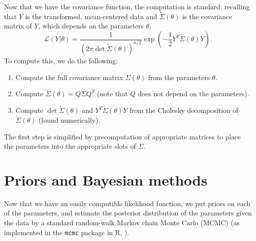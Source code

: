 \documentclass{article}
\begin{document}
Now that we have the covariance function, the computation is standard:
recalling that $Y$ is the transformed, mean-centered data and $\widetilde \Sigma(\theta)$ is the covariance matrix of $Y$,
which depends on the parameters $\theta$,
\begin{equation} \label{eqn:likelihood}
    \mathcal{L}(Y|\theta) = \frac{ 1 }{ \left( 2 \pi \det{\widetilde \Sigma(\theta)} \right)^{n/2} } \exp \left( - \frac{1}{2} Y^T {\widetilde \Sigma(\theta)} Y \right) .
\end{equation}
To compute this, we do the following:
\begin{enumerate}
    \item Compute the full covariance matrix $\Sigma(\theta)$ from the parameters $\theta$.
    \item Compute $\widetilde \Sigma(\theta) = Q \Sigma Q^T$ (note that $Q$ does not depend on the parameters).
    \item Compute $\det{\widetilde \Sigma(\theta)}$ and $Y^T {\widetilde \Sigma(\theta)} Y$ from the Cholesky decomposition of $\widetilde \Sigma(\theta)$ (found numerically).
\end{enumerate}
The first step is simplified by precomputation of appropriate matrices to place the parameters into the appropriate slots of $\Sigma$.


\section{Priors and Bayesian methods}

Now that we have an easily computible likelihood function,
we put priors on each of the parameters,
and estimate the posterior distribution of the parameters given the data
by a standard random-walk Markov chain Monte Carlo  (MCMC)
(as implemented in the \texttt{mcmc} package \citep{geyer2013mcmc} in R, \citet{R}).

\end{document}
